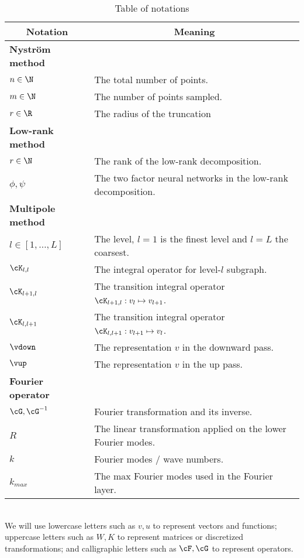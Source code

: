 
\iffalse
\begin{table}[ht]
\begin{center}
\begin{tabular}{|l|l|}
\multicolumn{1}{c}{\bf Notation} 
&\multicolumn{1}{c}{\bf Meaning}\\
\hline 
{\bf Nystr\"om  method} &\\
$n \in \N$ & The total number of points.\\
$m \in \N$ & The number of points sampled.\\
$r \in \R$  & The radius of the truncation\\
\hline 
{\bf Low-rank method} &\\
$r \in \N$ & The rank of the low-rank decomposition.\\
$\phi, \psi$ & The two factor neural networks in the low-rank decomposition.\\
\hline 
{\bf Multipole method} &\\
$l \in [1, \ldots, L] $ &  The level, $l=1$ is the finest level and $l=L$ the coarsest. \\
$\cK_{l,l}$  &  The integral operator for level-$l$ subgraph. \\
$\cK_{l+1,l}$  & The transition integral operator $\cK_{l+1,l}: v_l \mapsto v_{l+1}$.\\
$\cK_{l,l+1}$  &  The transition integral operator $\cK_{l,l+1}: v_{l+1} \mapsto v_{l}$.\\
$\vdown$  & The representation $v$ in the downward pass. \\
$\vup$  &  The representation $v$ in the up pass. \\
\hline 
{\bf Fourier operator} &\\
$\cG, \cG^{-1}$ & Fourier transformation and its inverse.\\
$R$ & The linear transformation applied on the lower Fourier modes.\\
$k$ & Fourier modes / wave numbers.\\
$k_{max}$ & The max Fourier modes used in the Fourier layer.\\
\hline
\end{tabular}\\
\small{We will use lowercase letters such as $v, u$ to represent vectors and functions; uppercase letters such as $W, K$ to represent matrices or discretized transformations; and calligraphic letters such as $\cF, \cG$ to represent operators.
}
\end{center}
\caption{Table of notations}
\label{table:notations2}
\end{table}


